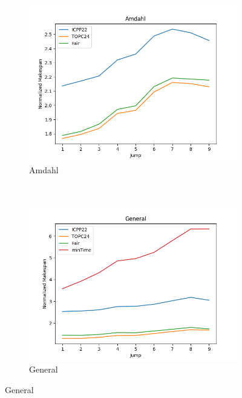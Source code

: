 \documentclass{article}
\begin{document}
\begin{figure}[htbp]
\begin{subfigure}[b]{0.32\textwidth}\includegraphics[width=\textwidth]{Results/Jump/Jump_Amdahl}\caption{Amdahl}\label{fig:lines_figures_Jump_Amdahl}\end{subfigure}
\\[2ex]
\begin{subfigure}[b]{0.32\textwidth}\includegraphics[width=\textwidth]{Results/Jump/Jump_General}\caption{General}\label{fig:lines_figures_Jump_General}\end{subfigure}
\hfill

\end{figure}
\end{document}

